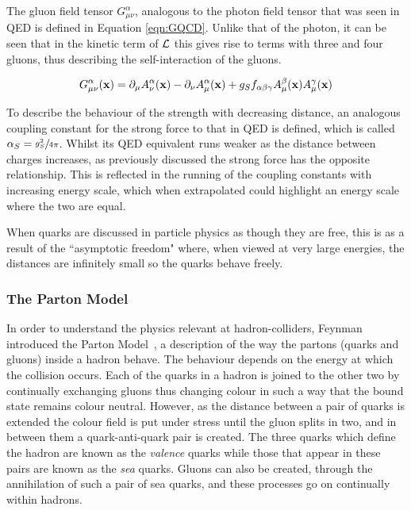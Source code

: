 The gluon field tensor $G^{\alpha}_{\mu \nu}$, analogous to the photon field tensor that was seen in QED is defined in Equation \ref{eqn:GQCD}. Unlike that of the photon, it can be seen that in the kinetic term of ${\mathcal{L}}$ this gives rise to terms with three and four gluons, thus describing the self-interaction of the gluons. 

\begin{equation}
G^{\alpha}_{\mu \nu} (\mathbf{x}) = \partial_{\mu} A^{\alpha}_{\nu} (\mathbf{x}) - \partial_{\nu}A^{\alpha}_{\mu}(\mathbf{x}) + g_{S} f_{\alpha \beta \gamma} A^{\beta}_{\mu}(\mathbf{x})A^{\gamma}_{\mu}(\mathbf{x})
\label{eqn:GQCD}
\end{equation}



 To describe the behaviour of the strength with decreasing distance, an analogous coupling constant for the strong force to that in QED is defined, which is called $\alpha_{S} = \sfrac{g_{S}^{2}}{4\pi}$. Whilst its QED equivalent runs weaker as the distance between charges increases, as previously discussed the strong force has the opposite relationship. This is reflected in the running of the coupling constants with increasing energy scale, which when extrapolated could highlight an energy scale where the two are equal. 
 
 When quarks are discussed in particle physics as though they are free, this is as a result of the ``asymptotic freedom" where, when viewed at very large energies, the distances are infinitely small so the quarks behave freely. 
 
 \subsubsection{The Parton Model}
 
In order to understand the physics relevant at hadron-colliders, Feynman introduced the Parton Model~\cite{partonfeyn}, a description of the way the partons (quarks and gluons) inside a hadron behave. The behaviour depends on the energy at which the collision occurs. Each of the quarks in a hadron is joined to the other two by continually exchanging gluons thus changing colour in such a way that the bound state remains colour neutral. However, as the distance between a pair of quarks is extended the colour field is put under stress until the gluon splits in two, and in between them a quark-anti-quark pair is created. The three quarks which define the hadron are known as the \textit{valence} quarks while those that appear in these pairs are known as the \textit{sea} quarks. Gluons can also be created, through the annihilation of such a pair of sea quarks, and these processes go on continually within hadrons. 
 
